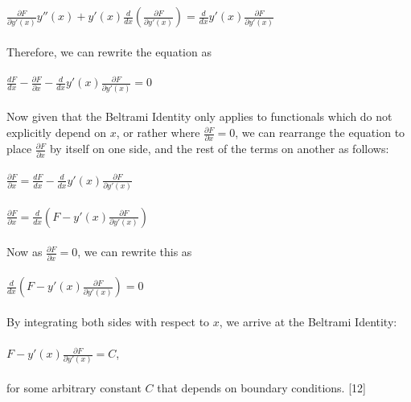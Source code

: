 \documentclass[12pt]{report}
\begin{document}
\\
\\
\(\frac{\partial F}{\partial y'(x)}y''(x) + y'(x)\frac{d}{dx}(\frac{\partial F}{\partial y'(x)}) = \frac{d}{dx}y'(x)\frac{\partial F}{\partial y'(x)}\)
\\
\\
Therefore, we can rewrite the equation as
\\
\\
\( \frac{dF}{dx} - \frac{\partial F}{\partial x} - \frac{d}{dx}y'(x)\frac{\partial F}{\partial y'(x)} = 0\)
\\
\\
Now given that the Beltrami Identity only applies to functionals which do not explicitly depend on \(x\), or rather where \(\frac{\partial F}{\partial x} = 0\), we can rearrange the equation to place \(\frac{\partial F}{\partial x}\) by itself on one side, and the rest of the terms on another as follows:
\\
\\
\( \frac{\partial F}{\partial x} = \frac{dF}{dx} - \frac{d}{dx}y'(x)\frac{\partial F}{\partial y'(x)}\)
\\
\\
\implies \( \frac{\partial F}{\partial x} = \frac{d}{dx}(F - y'(x)\frac{\partial F}{\partial y'(x)})\)
\\
\\
Now as \( \frac{\partial F}{\partial x} = 0\), we can rewrite this as
\\
\\
\(\frac{d}{dx}(F - y'(x)\frac{\partial F}{\partial y'(x)}) = 0\)
\\
\\
By integrating both sides with respect to \(x\), we arrive at the Beltrami Identity:
\\
\\
\(F - y'(x)\frac{\partial F}{\partial y'(x)} = C\),
\\
\\
for some arbitrary constant \(C\) that depends on boundary conditions. [12]
\end{document}
